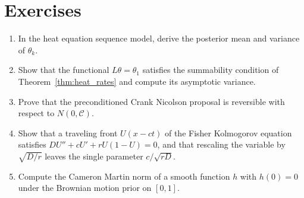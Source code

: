 \section*{Exercises}
\begin{enumerate}
\item In the heat equation sequence model, derive the posterior mean and variance of $\theta_k$.
\item Show that the functional $L\theta = \theta_1$ satisfies the summability condition of Theorem~\ref{thm:heat_rates} and compute its asymptotic variance.
\item Prove that the preconditioned Crank Nicolson proposal is reversible with respect to $N(0,\mathcal{C})$.
\item Show that a traveling front $U(x-ct)$ of the Fisher Kolmogorov equation satisfies $DU''+cU'+rU(1-U) = 0$, and that rescaling the variable by $\sqrt{D/r}$ leaves the single parameter $c/\sqrt{rD}$.
\item Compute the Cameron Martin norm of a smooth function $h$ with $h(0) = 0$ under the Brownian motion prior on $[0,1]$.
\end{enumerate}
